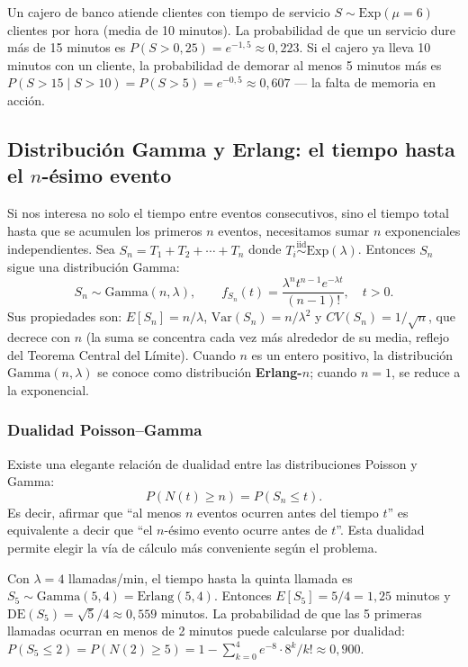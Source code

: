\documentclass[11pt, letterpaper]{article}
\begin{document}
\begin{ejemplo}
Un cajero de banco atiende clientes con tiempo de servicio $S \sim \text{Exp}(\mu = 6)$ clientes por hora (media de 10 minutos). La probabilidad de que un servicio dure más de 15 minutos es $P(S > 0{,}25) = e^{-1{,}5} \approx 0{,}223$. Si el cajero ya lleva 10 minutos con un cliente, la probabilidad de demorar al menos 5 minutos más es $P(S > 15 \mid S > 10) = P(S > 5) = e^{-0{,}5} \approx 0{,}607$ --- la falta de memoria en acción.
\end{ejemplo}

\subsection{Distribución Gamma y Erlang: el tiempo hasta el $n$-ésimo evento}

Si nos interesa no solo el tiempo entre eventos consecutivos, sino el tiempo total hasta que se acumulen los primeros $n$ eventos, necesitamos sumar $n$ exponenciales independientes. Sea $S_n = T_1 + T_2 + \cdots + T_n$ donde $T_i \overset{\text{iid}}{\sim} \text{Exp}(\lambda)$. Entonces $S_n$ sigue una distribución Gamma:
\[
    S_n \sim \text{Gamma}(n, \lambda), \qquad f_{S_n}(t) = \frac{\lambda^n t^{n-1} e^{-\lambda t}}{(n-1)!}, \quad t > 0.
\]
Sus propiedades son: $E[S_n] = n/\lambda$, $\text{Var}(S_n) = n/\lambda^2$ y $CV(S_n) = 1/\sqrt{n}$, que decrece con $n$ (la suma se concentra cada vez más alrededor de su media, reflejo del Teorema Central del Límite). Cuando $n$ es un entero positivo, la distribución $\text{Gamma}(n,\lambda)$ se conoce como distribución \textbf{Erlang-$n$}; cuando $n=1$, se reduce a la exponencial.

\subsubsection*{Dualidad Poisson--Gamma}

Existe una elegante relación de dualidad entre las distribuciones Poisson y Gamma:
\[
P(N(t) \geq n) = P(S_n \leq t).
\]
Es decir, afirmar que ``al menos $n$ eventos ocurren antes del tiempo $t$'' es equivalente a decir que ``el $n$-ésimo evento ocurre antes de $t$''. Esta dualidad permite elegir la vía de cálculo más conveniente según el problema.

\begin{ejemplo}
Con $\lambda = 4$ llamadas/min, el tiempo hasta la quinta llamada es $S_5 \sim \text{Gamma}(5, 4) = \text{Erlang}(5, 4)$. Entonces $E[S_5] = 5/4 = 1{,}25$ minutos y $\text{DE}(S_5) = \sqrt{5}/4 \approx 0{,}559$ minutos. La probabilidad de que las 5 primeras llamadas ocurran en menos de 2 minutos puede calcularse por dualidad: $P(S_5 \leq 2) = P(N(2) \geq 5) = 1 - \sum_{k=0}^{4} e^{-8}\cdot 8^k/k! \approx 0{,}900$.
\end{ejemplo}
\end{document}
